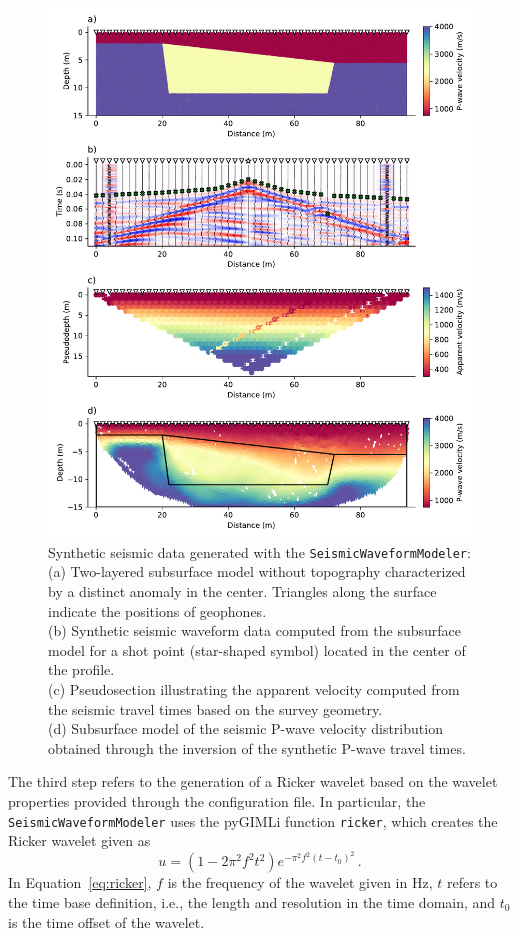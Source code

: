 \documentclass[a4paper,fleqn]{cas-sc}
\begin{document}
\begin{figure}
	\centering
	\includegraphics[width=.75\textwidth]{figures/synthetic_data_example.pdf}
	\caption{Synthetic seismic data generated with the \texttt{SeismicWaveformModeler}: \\(a) Two-layered subsurface model without topography characterized by a distinct anomaly in the center. Triangles along the surface indicate the positions of geophones. \\(b) Synthetic seismic waveform data computed from the subsurface model for a shot point (star-shaped symbol) located in the center of the profile. \\(c) Pseudosection illustrating the apparent velocity computed from the seismic travel times based on the survey geometry. \\(d) Subsurface model of the seismic P-wave velocity distribution obtained through the inversion of the synthetic P-wave travel times.}
	\label{fig:syndataexample}
\end{figure}

The third step refers to the generation of a Ricker wavelet based on the wavelet properties provided through the configuration file. In particular, the \texttt{SeismicWaveformModeler} uses the pyGIMLi function \texttt{ricker}, which creates the Ricker wavelet given as
\begin{equation}
	u = \left(1-2\pi^2f^2t^2\right)e^{-\pi^2f^2\left(t-t_0\right)^2}\,.
	\label{eq:ricker}
\end{equation}
In Equation~\ref{eq:ricker}, $f$ is the frequency of the wavelet given in \unit{Hz}, $t$ refers to the time base definition, i.e., the length and resolution in the time domain, and $t_0$ is the time offset of the wavelet.
\end{document}
